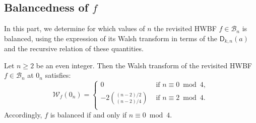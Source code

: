\documentclass[runningheads,orivec]{llncs}
\newcommand{\BN}{\mathcal{B}_n}
\newcommand{\Dkna}[3]{\mathsf{D}_{#2,#1}(a)}
\newcommand{\hwbf}{\textsf{HWBF}}
\newcommand{\wt}[1]{\mathcal W_{#1}}
\let\geq=\geqslant
\begin{document}
    \subsection{Balancedness of $f$}\label{sec:balancedness}
    
    In this part, we determine for which values of $n$ the revisited \hwbf{} $f\in\BN$ is balanced, using the expression of its Walsh transform in terms of the $\Dkna{n}{k}{a}$ and the recursive relation of these quantities.
    
    \begin{theorem}\label{th:bal}
    	Let $n\geq 2$ be an even integer.
    	Then the Walsh transform of the revisited \hwbf{} $f\in\BN$ at $0_n$ satisfies:
    	\[
    		\wt{f}(0_n)=\left\{\begin{array}{ll}
    			0&\text{ if }n\equiv 0\bmod 4,\\
    			-2\binom{(n-2)/2}{(n-2)/4}&\text{ if }n\equiv 2\bmod 4.\\
    		\end{array}\right.
    	\]
    	Accordingly, $f$ is balanced if and only if $n \equiv 0\bmod 4$.
    \end{theorem}
    
\end{document}
